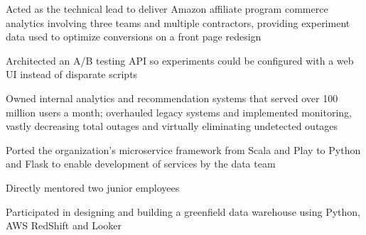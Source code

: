 \begin{job}

  \begin{accomplishments}
    \item Acted as the technical lead to deliver Amazon affiliate program
    commerce analytics involving three teams and multiple contractors, providing
    experiment data used to optimize conversions on a front page redesign
    \item Architected an A/B testing API so experiments could be configured with
    a web UI instead of disparate scripts
    \item Owned internal analytics and recommendation systems that served over
    100 million users a month; overhauled legacy systems and implemented
    monitoring, vastly decreasing total outages and virtually eliminating
    undetected outages
    \item Ported the organization's microservice framework from Scala and Play
    to Python and Flask to enable development of services by the data team
    \item Directly mentored two junior employees
  \end{accomplishments}
  \begin{extendedaccomplishments}

    \item Participated in designing and building a greenfield data warehouse
    using Python, AWS RedShift and Looker
  \end{extendedaccomplishments}
\end{job}
